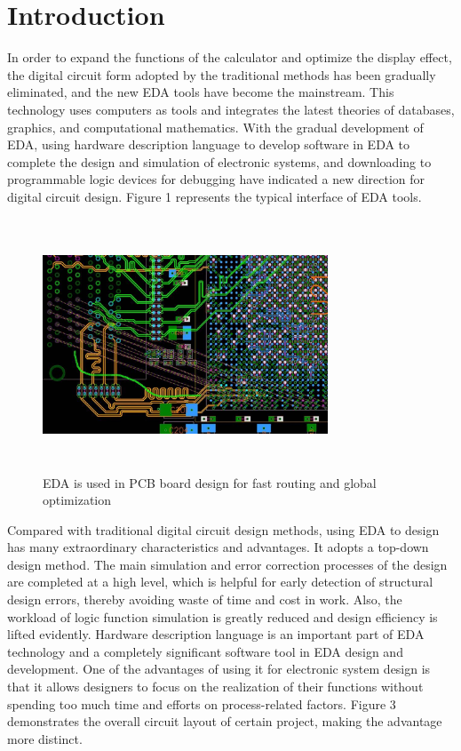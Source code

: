\documentclass[conference,compsoc]{IEEEtran}
\begin{document}
\section{Introduction}
In order to expand the functions of the calculator and optimize the display effect, the digital circuit form adopted by the traditional methods has been gradually eliminated, and the new EDA tools have become the mainstream. This technology uses computers as tools and integrates the latest theories of databases, graphics, and computational mathematics. With the gradual development of EDA, using hardware description language to develop software in EDA to complete the design and simulation of electronic systems, and downloading to programmable logic devices for debugging have indicated a new direction for digital circuit design. Figure 1 represents the typical interface of EDA tools.
\begin{figure}[H]
	\centering
	\includegraphics[width=8.5cm,height=7.5cm]{fig1}
	\caption{EDA is used in PCB board design for fast routing and global optimization}
	\label{Fig1}
\end{figure}
Compared with traditional digital circuit design methods, using EDA to design has many extraordinary characteristics and advantages. It adopts a top-down design method. The main simulation and error correction processes of the design are completed at a high level, which is helpful for early detection of structural design errors, thereby avoiding waste of time and cost in work. Also, the workload of logic function simulation is greatly reduced and design efficiency is lifted evidently. Hardware description language is an important part of EDA technology and a completely significant software tool in EDA design and development. One of the advantages of using it for electronic system design is that it allows designers to focus on the realization of their functions without spending too much time and efforts on process-related factors. Figure 3 demonstrates the overall circuit layout of certain project, making the advantage more distinct.
\end{document}
